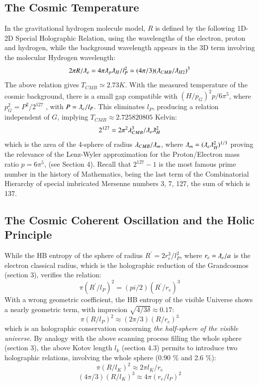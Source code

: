 \documentclass[twoside,draft]{article}
\begin{document}
\begin{sloppypar}
\subsection{The Cosmic Temperature}

In the gravitational hydrogen molecule model, $R$ is defined by the following 1D-2D Special
Holographic Relation, using the wavelengths of the electron, proton and hydrogen, while the background wavelength appears in the 3D term involving the molecular Hydrogen wavelength:
\begin{equation}
2 \pi R/\lambdabar_{e} = 4 \pi \lambdabar_{p} \lambdabar_{H} /l_{P}^2 \simeq (4\pi/3)(\lambdabar_{CMB} /\lambdabar_{H2})^{3}
\end{equation}
The above relation gives $T_{CMB} \simeq 2.73 K$. With the measured temperature of the cosmic
background, there is a small gap compatible with $(H/p_G)^2 p/6\pi^5 $, where $p_{G}^{2} = P^{2} /2^{127}$ , with $P = \lambdabar_{e} /l_{P}$. 
This eliminates $l_{P}$, producing a relation independent of $G$, implying $T_{CMB} \approx 2.725820805$ Kelvin:
$$2^{127} = 2\pi^{2} \lambda_{CMB}^{3} /\lambdabar_{e} \lambdabar_{H}^2$$
which is the area of the 4-sphere of radius $\lambda_{CMB} / \lambdabar_{m}$, where $\lambdabar_{m} = (\lambdabar_{e} \lambdabar_{H}^2)^{1/3} $ proving the relevance of
the Lenz-Wyler approximation for the Proton/Electron mass ratio $p = 6\pi^{5}$, (see Section 4). Recall
that $2^{127} - 1$ is the most famous prime number in the history of Mathematics, being the last term of
the Combinatorial Hierarchy \cite{Sanchez1} of special imbricated Mersenne numbers 3, 7, 127, the sum of which is 137.

\subsection{The Cosmic Coherent Oscillation and the Holic Principle}

While the HB entropy of the sphere of radius $R^{\prime} = 2r_e^3 / l_P^ 2$, where $r_e = \lambdabar_e /a $ is the electron classical radius, which is the holographic reduction of the Grandcosmos (section 3), verifies the relation:
\begin{equation}
\pi(R^{\prime}/l_P)^2 = (pi/2)(R^{\prime}/r_e)^3 
\end{equation}
With a wrong geometric coefficient, the HB entropy of the visible Universe shows a nearly geometric term, with imprecion $\sqrt{4/3\delta} \approx 0.17$:
\begin{equation}
\pi(R/l_P)^2 \approx (2\pi/3)(R/r_e)^3 
\end{equation}
which is an holographic conservation concerning \textit{the half-sphere of the visible universe}. By analogy with the above scanning process filling the whole sphere (section 3), the above Kotov length $l_k$ (section 4.3) permits to introduce two holographic relations, involving the whole sphere (0.90 \% and 2.6 \%):
\begin{equation}
\pi(R/l_K)^2 \approx 2\pi l_K/r_e 
\end{equation}
\begin{equation}
(4\pi/3)(R/l_K)^3 \approx 4\pi (r_e/l_P)^2 
\end{equation}


\end{sloppypar}
\end{document}
